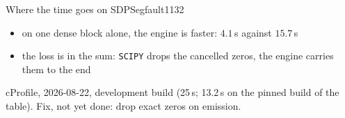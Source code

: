 \documentclass[10pt,mathserif,aspectratio=169]{beamer}
\newcommand{\bul}{\setlength\itemsep{1.1ex}}
\begin{document}
\begin{frame}[label=bk-sdpbreak]{Where the time goes on SDPSegfault1132}
\vspace{0.5ex}
\begin{itemize}\small\bul
  \item on one dense block alone, the engine is faster: $4.1$\,s against $15.7$\,s
  \item the loss is in the sum: \texttt{SCIPY} drops the cancelled zeros, the engine carries
        them to the end
\end{itemize}

\vfill
{\scriptsize\color{black!55} cProfile, 2026-08-22, development build (25\,s; 13.2\,s on the
pinned build of the table). Fix, not yet done: drop exact zeros on emission.}
\end{frame}

\end{document}

